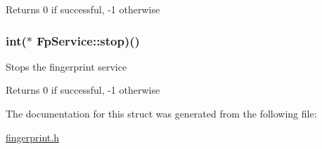 \begin{DoxyReturn}{\-Returns}
0 if successful, -\/1 otherwise 
\end{DoxyReturn}
\hypertarget{structFpService_a62ef18396745d1ea3de0efab1a90f1fb}{
\subsubsection[{stop}]{\setlength{\rightskip}{0pt plus 5cm}int($\ast$ {\bf \-Fp\-Service\-::stop})()}}\label{structFpService_a62ef18396745d1ea3de0efab1a90f1fb}
\-Stops the fingerprint service \begin{DoxyReturn}{\-Returns}
0 if successful, -\/1 otherwise 
\end{DoxyReturn}


\-The documentation for this struct was generated from the following file\-:\begin{DoxyCompactItemize}
\item 
\hyperlink{fingerprint_8h}{fingerprint.\-h}\end{DoxyCompactItemize}
